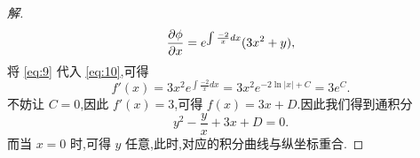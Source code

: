 \documentclass[a4paper, 12pt]{article} %
\begin{document}
\begin{CJK}{UTF8}{gkai}
\begin{proof}[解]
\begin{equation}
  \label{eq:10}
  \frac{\partial\phi}{\partial x}=e^{\int \frac{-2}{x}dx}(3x^2+y),
\end{equation}
将 \eqref{eq:9} 代入 \eqref{eq:10},可得
\begin{equation}
  \label{eq:11}
  f'(x)=3x^2e^{\int
  \frac{-2}{x}dx}=3x^2e^{-2\ln |x|+C}=3e^{C}.
\end{equation}
不妨让 $C=0$,因此 $f'(x)=3$,可得 $f(x)=3x+D$.因此我们得到通积分
\begin{equation}
  \label{eq:12}
  y^2-\frac{y}{x}+3x+D=0.
\end{equation}
而当 $x=0$ 时,可得 $y$ 任意,此时,对应的积分曲线与纵坐标重合.
  \end{proof}
  
  
  
  
  
\end{CJK}
\end{document}
